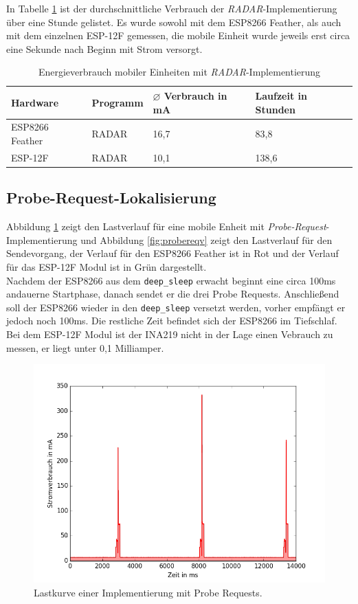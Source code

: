 In Tabelle \ref{table:radarina} ist der durchschnittliche Verbrauch der \emph{RADAR}-Implementierung über eine Stunde gelistet.
Es wurde sowohl mit dem ESP8266 Feather, als auch mit dem einzelnen ESP-12F gemessen, die mobile Einheit wurde jeweils erst circa eine Sekunde nach Beginn mit Strom versorgt.

\begin{table}[h!]
	\centering
	\caption{Energieverbrauch mobiler Einheiten mit \emph{RADAR}-Implementierung}
	\label{table:radarina}
	\begin{tabular}{p{3.5cm}|p{5cm}|p{2.5cm}|p{2.5cm}}
		Hardware & Programm & $\varnothing$ Verbrauch in mA & Laufzeit in Stunden\\
		\hline
		ESP8266 Feather & RADAR & 16,7 & 83,8\\
		ESP-12F & RADAR & 10,1 & 138,6\\
	\end{tabular}
\end{table}

\subsection{Probe-Request-Lokalisierung}
\label{ch:phase2:sec:powerprobereq}
Abbildung \ref{fig:probereqfull} zeigt den Lastverlauf für eine mobile Enheit mit \emph{Probe-Request}-Implementierung und Abbildung \ref{fig:probereqv} zeigt den Lastverlauf für den Sendevorgang, der Verlauf für den ESP8266 Feather ist in Rot und der Verlauf für das ESP-12F Modul ist in Grün dargestellt.\\
Nachdem der ESP8266 aus dem \texttt{deep\_sleep} erwacht beginnt eine circa 100ms andauerne Startphase, danach sendet er die drei Probe Requests.
Anschließend soll der ESP8266 wieder in den \texttt{deep\_sleep} versetzt werden, vorher empfängt er jedoch noch 100ms.
Die restliche Zeit befindet sich der ESP8266 im Tiefschlaf. 
Bei dem ESP-12F Modul ist der INA219 nicht in der Lage einen Vebrauch zu messen, er liegt unter 0,1 Milliamper.\\

\begin{figure}[h!]
  \centering
	\includegraphics[width=\textwidth]{plots/probereqfull.png}
  \caption{Lastkurve einer Implementierung mit Probe Requests.}
  \label{fig:probereqfull}
\end{figure}

